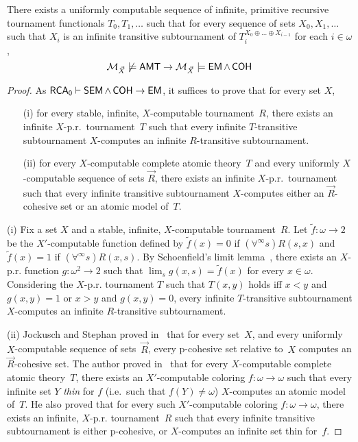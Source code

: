 \begin{lemma}\label{lem:em-uniform-model}
There exists a uniformly computable sequence of infinite, primitive recursive tournament functionals
$T_0, T_1, \dots$ such that for every sequence of sets $X_0, X_1, \dots$ such that
$X_i$ is an infinite transitive subtournament of $T_i^{X_0 \oplus \dots \oplus X_{i-1}}$
for each $i \in \omega$,
$$
\mathcal{M}_{\vec{X}} \not \models \operatorname{\sf{AMT}} \rightarrow \mathcal{M}_{\vec{X}} \models \operatorname{\sf{EM}} \wedge \operatorname{\sf{COH}}
$$
\end{lemma}
\begin{proof}
As $\operatorname{\sf{RCA}_0} \vdash \operatorname{\sf{SEM}} \wedge \operatorname{\sf{COH}} \rightarrow \operatorname{\sf{EM}}$,
it suffices to prove that for every set $X$, 
\begin{itemize}
	\item[(i)] for every stable, infinite, $X$-computable tournament~$R$, there exists an infinite $X$-p.r.\ tournament~$T$
	such that every infinite $T$-transitive subtournament $X$-computes an infinite $R$-transitive subtournament.
	\item[(ii)] for every $X$-computable complete atomic theory~$T$ and every
uniformly $X$-computable sequence of sets $\vec{R}$, there exists an infinite $X$-p.r.\ tournament
such that every infinite transitive subtournament $X$-computes either an $\vec{R}$-cohesive set
or an atomic model of~$T$.
\end{itemize}

(i)
Fix a set $X$ and a stable, infinite, $X$-computable tournament~$R$.
Let $\tilde{f} : \omega \to 2$ be the $X'$-computable function defined by $\tilde{f}(x) = 0$
if $(\forall^\infty s) R(s, x)$ and $\tilde{f}(x) = 1$ if $(\forall^\infty s) R(x, s)$.
By Schoenfield's limit lemma~\cite{Shoenfield1959degrees}, there exists an $X$-p.r.
function $g : \omega^2 \to 2$ such that $\lim_s g(x, s) = \tilde{f}(x)$ for every $x \in \omega$.
Considering the $X$-p.r. tournament $T$ such that $T(x,y)$ holds iff $x < y$ and $g(x, y) = 1$
or $x > y$ and $g(x, y) = 0$, every infinite $T$-transitive subtournament $X$-computes an infinite
$R$-transitive subtournament.

(ii) Jockusch and Stephan proved in~\cite{Jockusch1993cohesive} that for every set~$X$,
and every uniformly $X$-computable sequence of sets~$\vec{R}$, 
every p-cohesive set relative to~$X$ computes an $\vec{R}$-cohesive set.
The author proved in~\cite{Patey2015Somewhere} that for every $X$-computable complete atomic theory~$T$,
there exists an $X'$-computable coloring $f : \omega \to \omega$ such that every infinite
set $Y$ \emph{thin} for $f$ (i.e.\ such that $f(Y) \neq \omega$) $X$-computes an atomic model of~$T$.
He also proved that for every such $X'$-computable coloring $f : \omega \to \omega$,
there exists an infinite, $X$-p.r. tournament~$R$ such that every infinite transitive subtournament
is either p-cohesive, or $X$-computes an infinite set thin for~$f$.
\end{proof}

